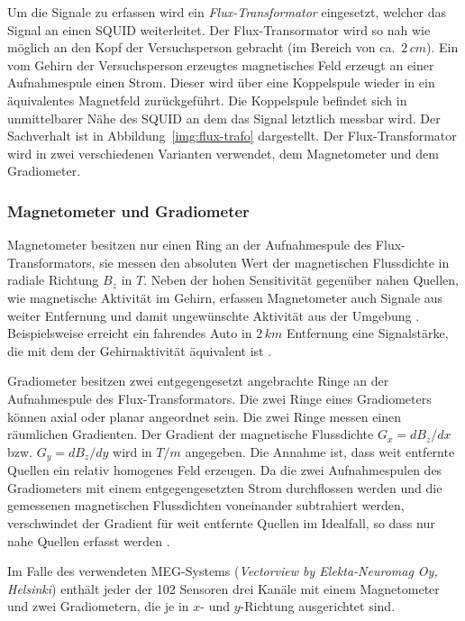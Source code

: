 \documentclass[doc,a4paper,12pt]{apa6}
\begin{document}
Um die Signale zu erfassen wird ein \emph{Flux-Transformator} eingesetzt, welcher das Signal an einen SQUID weiterleitet. Der Flux-Transormator wird so nah wie möglich an den Kopf der Versuchsperson gebracht (im Bereich von ca.~$2\,cm$). Ein vom Gehirn der Versuchsperson erzeugtes magnetisches Feld erzeugt an einer Aufnahmespule einen Strom. Dieser wird über eine Koppelspule wieder in ein äquivalentes Magnetfeld zurückgeführt. Die Koppelspule befindet sich in unmittelbarer Nähe des SQUID an dem das Signal letztlich messbar wird. Der Sachverhalt ist in Abbildung~\ref{img:flux-trafo} dargestellt. Der Flux-Transformator wird in zwei verschiedenen Varianten verwendet, dem Magnetometer und dem Gradiometer.

\subsubsection{Magnetometer und Gradiometer}

Magnetometer besitzen nur einen Ring an der Aufnahmespule des Flux-Transformators, sie messen den absoluten Wert der magnetischen Flussdichte in radiale Richtung $B_z$ in $T$. Neben der hohen Sensitivität gegenüber nahen Quellen, wie magnetische Aktivität im Gehirn, erfassen Magnetometer auch Signale aus weiter Entfernung und damit ungewünschte Aktivität aus der Umgebung \parencite{hansen2010meg}. Beispielsweise erreicht ein fahrendes Auto in $2\,km$ Entfernung eine Signalstärke, die mit dem der Gehirnaktivität äquivalent ist \parencite{weinstock2012squid}.

Gradiometer besitzen zwei entgegengesetzt angebrachte Ringe an der Aufnahmespule des Flux-Transformators. Die zwei Ringe eines Gradiometers können axial oder planar angeordnet sein. Die zwei Ringe messen einen räumlichen Gradienten. Der Gradient der magnetische Flussdichte $G_x = dB_z/dx$ bzw. $G_y = dB_z/dy$ wird in $T/m$ angegeben. Die Annahme ist, dass weit entfernte Quellen ein relativ homogenes Feld erzeugen. Da die zwei Aufnahmespulen des Gradiometers mit einem entgegengesetzten Strom durchflossen werden und die gemessenen magnetischen Flussdichten voneinander subtrahiert werden, verschwindet der Gradient für weit entfernte Quellen im Idealfall, so dass nur nahe Quellen erfasst werden \parencite{hansen2010meg}.

Im Falle des verwendeten MEG-Systems (\emph{Vectorview by Elekta-Neuromag Oy, Helsinki}) enthält jeder der 102 Sensoren drei Kanäle mit einem Magnetometer und zwei Gradiometern, die je in $x$- und $y$-Richtung ausgerichtet sind.
\end{document}

